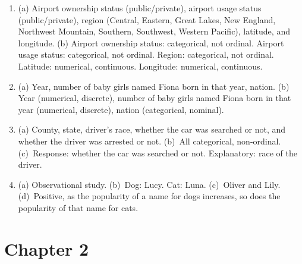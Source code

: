 \documentclass[
  10pt,
  openany]{book}
\begin{document}
\begin{enumerate}
  \addtocounter{enumi}{1}
\item
  (a) Airport ownership status (public/private), airport usage status (public/private), region (Central, Eastern, Great Lakes, New England, Northwest Mountain, Southern, Southwest, Western Pacific), latitude, and longitude. (b) Airport ownership status: categorical, not ordinal. Airport usage status: categorical, not ordinal. Region: categorical, not ordinal. Latitude: numerical, continuous. Longitude: numerical, continuous.

  \addtocounter{enumi}{1}
\item
  (a) Year, number of baby girls named Fiona born in that year, nation. (b) Year (numerical, discrete), number of baby girls named Fiona born in that year (numerical, discrete), nation (categorical, nominal).

  \addtocounter{enumi}{1}
\item
  (a) County, state, driver's race, whether the car was searched or not, and whether the driver was arrested or not. (b)~All categorical, non-ordinal. (c)~Response: whether the car was searched or not. Explanatory: race of the driver.

  \addtocounter{enumi}{1}
\item
  (a) Observational study. (b)~Dog: Lucy. Cat: Luna. (c)~Oliver and Lily. (d)~Positive, as the popularity of a name for dogs increases, so does the popularity of that name for cats.

  \addtocounter{enumi}{1}
\end{enumerate}

\hypertarget{exercise-solutions-02}{%
\section{Chapter 2}\label{exercise-solutions-02}}

\vspace{-2mm}
\end{document}
